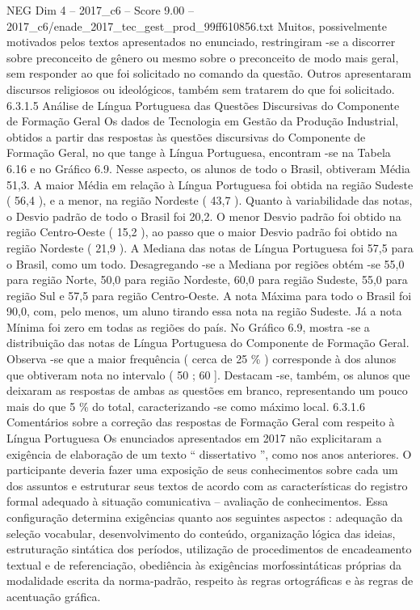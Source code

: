 \begin{textsample}{NEG Dim 4 – 2017\_c6 – Score 9.00 – 2017\_c6/enade\_2017\_tec\_gest\_prod\_99ff610856.txt}
Muitos, possivelmente motivados pelos textos apresentados no enunciado, restringiram -se a discorrer sobre preconceito de gênero ou mesmo sobre o preconceito de modo mais geral, sem responder ao que foi solicitado no comando da questão.
Outros apresentaram discursos religiosos ou ideológicos, também sem tratarem do que foi solicitado. 6.3.1.5 Análise de Língua Portuguesa das Questões Discursivas do Componente de Formação Geral Os dados de Tecnologia em Gestão da Produção Industrial, obtidos a partir das respostas às questões discursivas do Componente de Formação Geral, no que tange à Língua Portuguesa, encontram -se na Tabela 6.16 e no Gráfico 6.9.
Nesse aspecto, os alunos de todo o Brasil, obtiveram Média 51,3.
A maior Média em relação à Língua Portuguesa foi obtida na região Sudeste ( 56,4 ), e a menor, na região Nordeste ( 43,7 ).
Quanto à variabilidade das notas, o Desvio padrão de todo o Brasil foi 20,2.
O menor Desvio padrão foi obtido na região Centro-Oeste ( 15,2 ), ao passo que o maior Desvio padrão foi obtido na região Nordeste ( 21,9 ).
A Mediana das notas de Língua Portuguesa foi 57,5 para o Brasil, como um todo.
Desagregando -se a Mediana por regiões obtém -se 55,0 para região Norte, 50,0 para região Nordeste, 60,0 para região Sudeste, 55,0 para região Sul e 57,5 para região Centro-Oeste.
A nota Máxima para todo o Brasil foi 90,0, com, pelo menos, um aluno tirando essa nota na região Sudeste.
Já a nota Mínima foi zero em todas as regiões do país.
No Gráfico 6.9, mostra -se a distribuição das notas de Língua Portuguesa do Componente de Formação Geral.
Observa -se que a maior frequência ( cerca de 25 \% ) corresponde à dos alunos que obtiveram nota no intervalo ( 50 ; 60 ].
Destacam -se, também, os alunos que deixaram as respostas de ambas as questões em branco, representando um pouco mais do que 5 \% do total, caracterizando -se como máximo local. 6.3.1.6 Comentários sobre a correção das respostas de Formação Geral com respeito à Língua Portuguesa Os enunciados apresentados em 2017 não explicitaram a exigência de elaboração de um texto “ dissertativo ”, como nos anos anteriores.
O participante deveria fazer uma exposição de seus conhecimentos sobre cada um dos assuntos e estruturar seus textos de acordo com as características do registro formal adequado à situação comunicativa – avaliação de conhecimentos.
Essa configuração determina exigências quanto aos seguintes aspectos : adequação da seleção vocabular, desenvolvimento do conteúdo, organização lógica das ideias, estruturação sintática dos períodos, utilização de procedimentos de encadeamento textual e de referenciação, obediência às exigências morfossintáticas próprias da modalidade escrita da norma-padrão, respeito às regras ortográficas e às regras de acentuação gráfica.

\end{textsample}
